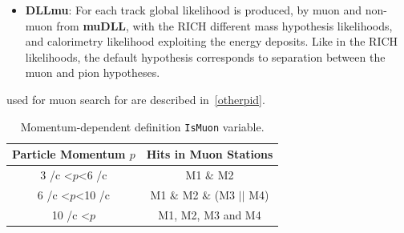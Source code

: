 \begin{itemize}
	\DIFaddend \item{\textbf{DLLmu}}:  For each track \DIFdelbegin {}\DIFdelend \DIFaddbegin {}\DIFaddend global likelihood is produced, by \DIFdelbegin {}\DIFdelend \DIFaddbegin {}\DIFaddend muon and non-muon \DIFdelbegin {}\DIFdelend \DIFaddbegin {}\DIFaddend from \textbf{muDLL}, with the \Gls{RICH} different mass hypothesis likelihoods, and \DIFaddbegin {}\DIFaddend calorimetry likelihood exploiting \DIFaddbegin {}\DIFaddend the energy deposits\DIFdelbegin {}\DIFdelend . Like in the \Gls{RICH} likelihoods, the default hypothesis corresponds to separation between the muon and pion hypotheses.    

 \end{itemize} 

\noindent \DIFdelbegin {}\DIFdelend \DIFaddbegin {}\Bmumumu {}\texttt{} \texttt{} \DIFaddend used for muon \DIFdelbegin {}\DIFdelend \DIFaddbegin {}\DIFaddend search for \Bmumumu\DIFaddbegin \DIFadd{, }\DIFaddend are described in~\autoref{otherpid}. \DIFaddbegin {}\DIFaddend 

\begin{table}[!h]
	\centering
	\hspace*{-0.8cm}
	\begin{tabular}{c c}
		\toprule
		Particle Momentum $p$  & Hits in Muon Stations \\ \hline
		3 \gev/c <$p$<6 \gev/c & M1 $\&$ M2\\
		6 \gev/c <$p$<10 \gev/c & M1 $\&$ M2 $\&$ (M3 $||$ M4) \\
		10 \gev/c <$p$ & M1, M2, M3 and M4 \\ \bottomrule      
	\end{tabular}
	\caption{Momentum-dependent definition \texttt{IsMuon} variable.}
	\label{tab:ismuontab}
\end{table}   

